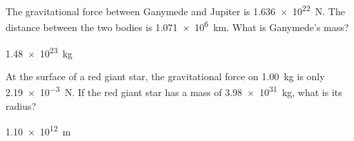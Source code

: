 \begin{question}[ID=gravity-C-Q03,topic=gravity,difficulty=C]
    The gravitational force between Ganymede and Jupiter is
        \SI{1.636e22}{\newton}.
    The distance between the two bodies is \SI{1.071e6}{\kilo\meter}.
    What is Ganymede's mass?
\end{question}
\begin{solution}
    \SI{1.48e23}{\kilo\gram}
\end{solution}


\begin{question}[ID=gravity-C-Q04,topic=gravity,difficulty=C]
    At the surface of a red giant star, the gravitational force
        on \SI{1.00}{\kilo\gram} is only \SI{2.19e-3}{\newton}.
    If the red giant star has a mass of \SI{3.98e31}{\kilo\gram},
        what is its radius?
\end{question}
\begin{solution}
    \SI{1.10e12}{\meter}
\end{solution}


\endinput


